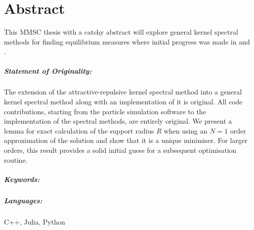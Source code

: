 \chapter*{Abstract}
\label{chap:abstract}
This MMSC thesis with a catchy abstract will explore general kernel spectral methods for finding equilibrium measures where initial progress was made in \cite{2020-power-law-kernels} and \cite{2021-arbitrary-dimensions}.
\hierKoennteIhreWerbungStehen

\paragraph{Statement of Originality:}
The extension of the attractive-repulsive kernel spectral method into a general kernel spectral method along with an implementation of it is original.
All code contributions, starting from the particle simulation software to the implementation of the spectral methods, are entirely original.
We present a lemma for exact calculation of the support radius $R$ when using an $N = 1$ order approximation of the solution and show that it is a unique minimiser.
For larger orders, this result provides a solid initial guess for a subsequent optimisation routine.

\paragraph{Keywords:}
\thesiskeywords

\paragraph{Languages:}
C++, Julia, Python
